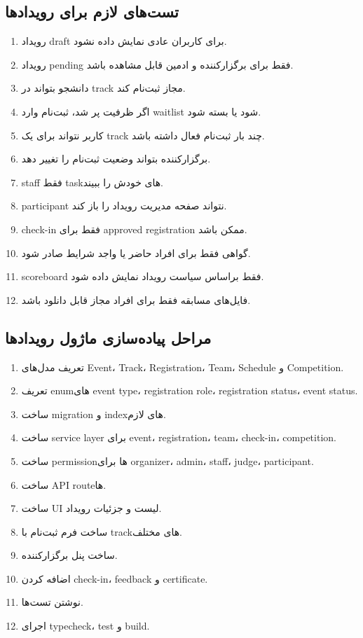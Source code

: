 \documentclass[12pt,a4paper]{article}
\begin{document}
\subsection{تست‌های لازم برای رویدادها}
\begin{enumerate}
\item رویداد draft برای کاربران عادی نمایش داده نشود.
\item رویداد pending فقط برای برگزارکننده و ادمین قابل مشاهده باشد.
\item دانشجو بتواند در track مجاز ثبت‌نام کند.
\item اگر ظرفیت پر شد، ثبت‌نام وارد waitlist شود یا بسته شود.
\item کاربر نتواند برای یک track چند بار ثبت‌نام فعال داشته باشد.
\item برگزارکننده بتواند وضعیت ثبت‌نام را تغییر دهد.
\item staff فقط taskهای خودش را ببیند.
\item participant نتواند صفحه مدیریت رویداد را باز کند.
\item check-in فقط برای approved registration ممکن باشد.
\item گواهی فقط برای افراد حاضر یا واجد شرایط صادر شود.
\item scoreboard فقط براساس سیاست رویداد نمایش داده شود.
\item فایل‌های مسابقه فقط برای افراد مجاز قابل دانلود باشد.
\end{enumerate}

\subsection{مراحل پیاده‌سازی ماژول رویدادها}
\begin{enumerate}
\item تعریف مدل‌های Event، Track، Registration، Team، Schedule و Competition.
\item تعریف enumهای event type، registration role، registration status، event status.
\item ساخت migration و indexهای لازم.
\item ساخت service layer برای event، registration، team، check-in، competition.
\item ساخت permissionها برای organizer، admin، staff، judge، participant.
\item ساخت API routeها.
\item ساخت UI لیست و جزئیات رویداد.
\item ساخت فرم ثبت‌نام با trackهای مختلف.
\item ساخت پنل برگزارکننده.
\item اضافه کردن check-in، feedback و certificate.
\item نوشتن تست‌ها.
\item اجرای typecheck، test و build.
\end{enumerate}
\end{document}
